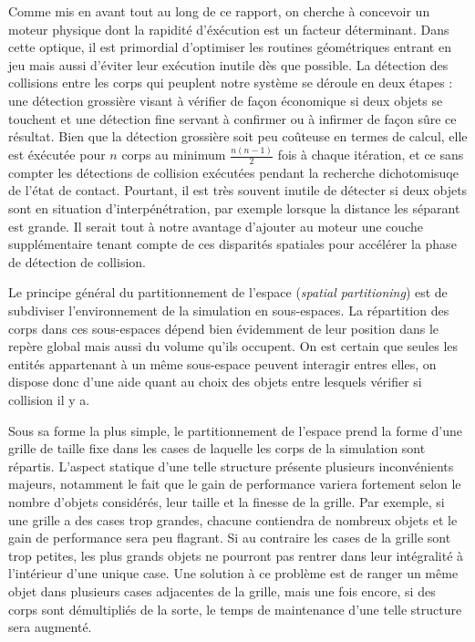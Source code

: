 Comme mis en avant tout au long de ce rapport, on cherche à concevoir
un moteur physique dont la rapidité d'éxécution est un facteur
déterminant. Dans cette optique, il est primordial d'optimiser les
routines géométriques entrant en jeu mais aussi d'éviter leur
exécution inutile dès que possible. La détection des collisions entre
les corps qui peuplent notre système se déroule en deux étapes : une
détection grossière visant à vérifier de façon économique si deux
objets se touchent et une détection fine servant à confirmer ou à
infirmer de façon sûre ce résultat. Bien que la détection grossière
soit peu coûteuse en termes de calcul, elle est éxécutée pour $n$
corps au minimum $\frac{n(n-1)}{2}$ fois à chaque itération, et ce
sans compter les détections de collision exécutées pendant la
recherche dichotomisuqe de l'état de contact. Pourtant, il est très
souvent inutile de détecter si deux objets sont en situation
d'interpénétration, par exemple lorsque la distance les séparant est
grande. Il serait tout à notre avantage d'ajouter au moteur une couche
supplémentaire tenant compte de ces disparités spatiales pour
accélérer la phase de détection de collision.

Le principe général du partitionnement de l'espace (\textit{spatial
  partitioning}) est de subdiviser l'environnement de la simulation en
sous-espaces. La répartition des corps dans ces sous-espaces dépend
bien évidemment de leur position dans le repère global mais aussi du
volume qu'ils occupent. On est certain que seules les entités
appartenant à un même sous-espace peuvent interagir entres elles, on
dispose donc d'une aide quant au choix des objets entre lesquels
vérifier si collision il y a.

Sous sa forme la plus simple, le partitionnement de l'espace prend la
forme d'une grille de taille fixe dans les cases de laquelle les corps
de la simulation sont répartis. L'aspect statique d'une telle
structure présente plusieurs inconvénients majeurs, notamment le fait
que le gain de performance variera fortement selon le nombre d'objets
considérés, leur taille et la finesse de la grille. Par exemple, si
une grille a des cases trop grandes, chacune contiendra de nombreux
objets et le gain de performance sera peu flagrant. Si au contraire
les cases de la grille sont trop petites, les plus grands objets ne
pourront pas rentrer dans leur intégralité à l'intérieur d'une unique
case. Une solution à ce problème est de ranger un même objet dans
plusieurs cases adjacentes de la grille, mais une fois encore, si des
corps sont démultipliés de la sorte, le temps de maintenance d'une
telle structure sera augmenté.

